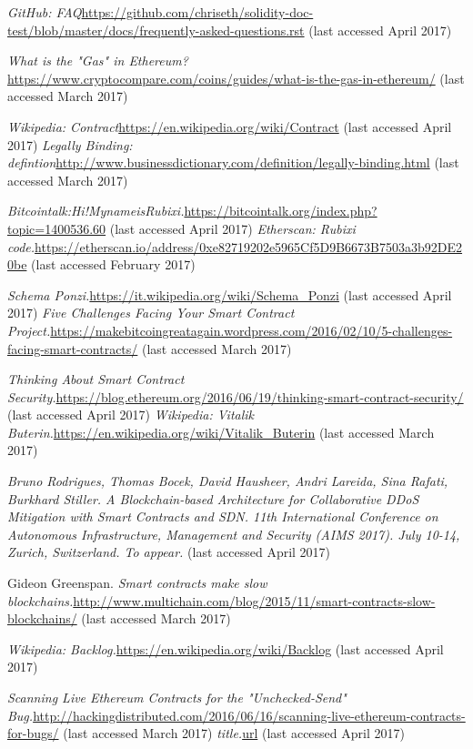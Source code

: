 \begin{thebibliography}{99}
\emph{GitHub: FAQ}\url{https://github.com/chriseth/solidity-doc-test/blob/master/docs/frequently-asked-questions.rst} (last accessed April 2017)




\emph{What is the "Gas" in Ethereum?}\url{https://www.cryptocompare.com/coins/guides/what-is-the-gas-in-ethereum/} (last accessed March 2017)

\emph{Wikipedia: Contract}\url{https://en.wikipedia.org/wiki/Contract} (last accessed April 2017)
\emph{Legally Binding: defintion}\url{http://www.businessdictionary.com/definition/legally-binding.html} (last accessed March 2017)


\emph{Bitcointalk:Hi!MynameisRubixi.}\url{https://bitcointalk.org/index.php?topic=1400536.60} (last accessed April 2017)
\emph{Etherscan: Rubixi code.}\url{https://etherscan.io/address/0xe82719202e5965Cf5D9B6673B7503a3b92DE20be} (last accessed February 2017)
    
    
\emph{Schema Ponzi.}\url{https://it.wikipedia.org/wiki/Schema_Ponzi} (last accessed April 2017)
\emph{Five Challenges Facing Your Smart Contract Project.}\url{https://makebitcoingreatagain.wordpress.com/2016/02/10/5-challenges-facing-smart-contracts/} (last accessed March 2017)

\emph{Thinking About Smart Contract Security.}\url{https://blog.ethereum.org/2016/06/19/thinking-smart-contract-security/} (last accessed April 2017)
\emph{Wikipedia: Vitalik Buterin.}\url{https://en.wikipedia.org/wiki/Vitalik_Buterin} (last accessed March 2017)


\emph{Bruno Rodrigues, Thomas Bocek, David Hausheer, Andri Lareida, Sina Rafati, Burkhard Stiller. A Blockchain-based Architecture for Collaborative DDoS Mitigation with Smart Contracts and SDN. 11th International Conference on Autonomous Infrastructure, Management and Security (AIMS 2017). July 10-14, Zurich, Switzerland. To appear.} (last accessed April 2017)

 Gideon Greenspan. \emph{Smart contracts make slow blockchains.}\url{http://www.multichain.com/blog/2015/11/smart-contracts-slow-blockchains/} (last accessed March 2017)


\emph{Wikipedia: Backlog.}\url{https://en.wikipedia.org/wiki/Backlog} (last accessed April 2017)


\emph{Scanning Live Ethereum Contracts for the "Unchecked-Send" Bug.}\url{http://hackingdistributed.com/2016/06/16/scanning-live-ethereum-contracts-for-bugs/} (last accessed March 2017)
\emph{title.}\url{url} (last accessed April 2017)




\end{thebibliography}
